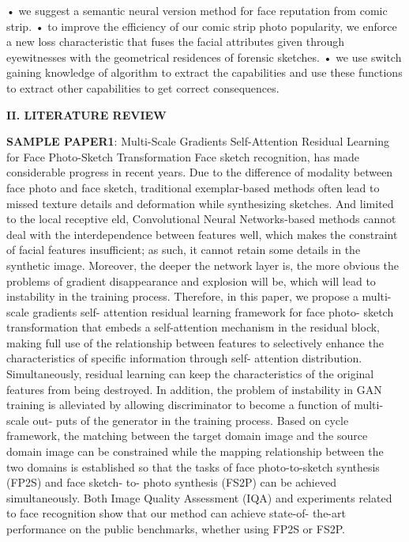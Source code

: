 \documentclass[journal]{IEEEtran} %
\begin{document}
• we suggest a semantic neural version method for face reputation from comic strip.
• to improve the efficiency of our comic strip photo popularity, we enforce a new loss characteristic that fuses the facial attributes given through eyewitnesses with the geometrical residences of forensic sketches.
• we use switch gaining knowledge of algorithm to extract the capabilities and use these functions to extract other capabilities to get correct consequences.

\textbf{II. LITERATURE REVIEW}

\textbf{SAMPLE PAPER1}:
Multi-Scale Gradients Self-Attention Residual Learning for Face          Photo-Sketch Transformation
Face sketch recognition, has made considerable progress in recent years. Due to the difference of modality between face photo and face sketch, traditional exemplar-based methods often lead to missed texture details and deformation while synthesizing sketches. And limited to the local receptive eld, Convolutional Neural Networks-based methods cannot deal with the interdependence between features well, which makes the constraint of facial features insufficient; as such, it cannot retain some details in the synthetic image.
Moreover, the deeper the network layer is, the more obvious the problems of gradient disappearance and explosion will be, which will lead to instability in the training process. Therefore, in this paper, we propose a multi-scale gradients self- attention residual learning framework for face photo- sketch transformation that embeds a self-attention mechanism in the residual block, making full use of the relationship between features to selectively enhance the characteristics of specific information through self- attention distribution. Simultaneously, residual learning can keep the characteristics of the original features from being destroyed.
In addition, the problem of instability in GAN training is alleviated by allowing discriminator to become a function of multi-scale out- puts of the generator in the training process. Based on cycle framework, the matching between the target domain image and the source domain image can be constrained while the mapping relationship between the two domains is established so that the tasks of face photo-to-sketch synthesis (FP2S) and face sketch- to- photo synthesis (FS2P) can be achieved simultaneously. Both Image Quality Assessment (IQA) and experiments related to face recognition show that our method can achieve state-of- the-art performance on the public benchmarks, whether using FP2S or FS2P.
\end{document}
